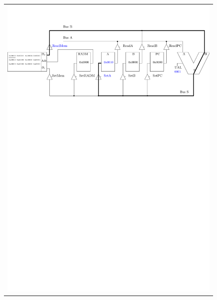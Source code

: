 \begin{figure}[htbp]
\begin{tabular}{c}
\includegraphics[width=\linewidth]{Figs/premier_chemin_lda_2.pdf}\\

\end{tabular}
\end{figure}
